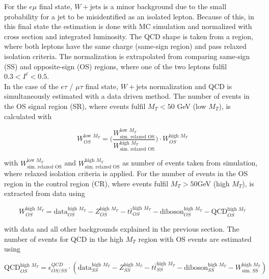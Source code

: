 For the $e\mu$ final state, $W + \text{jets}$ is a minor background due to the small probability for a jet to be misidentified as an isolated lepton. Because of this, in this final state the estimation is done with \gls{MC} simulation and normalized with cross section and integrated luminosity. The \gls{QCD} shape is taken from a region, where both leptons have the same charge (same-sign region) and pass relaxed isolation criteria. The normalization is extrapolated from comparing same-sign (SS) and opposite-sign (OS) regions, where one of the two leptons fulfil $0.3 < I^{\ell} < 0.5$.  \\

In the case of the $e\tau$ / $\mu\tau$ final state, $W + \text{jets}$ normalization and \gls{QCD} is simultaneously estimated with a data driven method. The number of events in the OS signal region (SR), where events fulfil $M_T < 50$ GeV (low $M_T$), is calculated with 

\begin{equation}
	W^{\text{low } M_T}_{OS} = \Bigg(\frac{W^{\text{low } M_T}_{\text{sim. relaxed OS}}}{W^{\text{high } M_T}_{\text{sim. relaxed OS}}}\Bigg) \cdot W^{\text{high } M_T}_{OS}
\end{equation}

with $W^{\text{low } M_T}_{\text{sim. relaxed OS}}$ and $W^{\text{high } M_T}_{\text{sim. relaxed OS}}$ as number of events taken from simulation, where relaxed isolation criteria is applied. For the number of events in the OS region in the control region (CR), where events fulfil $M_T > 50$GeV (high $M_T$), is extracted from data using 

\begin{equation}
	W^{\text{high } M_T}_{OS} = \text{data}^{\text{high } M_T}_{OS} - Z^{\text{high } M_T}_{OS} - t\bar{t}^{\text{high } M_T}_{OS} - \text{diboson}^{\text{high } M_T}_{OS} - \text{QCD}^{\text{high } M_T}_{OS}
\end{equation}

with data and all other backgrounds explained in the previous section. The number of events for QCD in the high $M_T$ region with OS events are estimated using

\begin{equation}
\text{QCD}^{\text{high } M_T}_{OS} = \epsilon^{QCD}_{OS/SS} \cdot (\text{data}^{\text{high } M_T}_{SS} - Z^{\text{high } M_T}_{SS} - t\bar{t}^{\text{high } M_T}_{SS} - \text{diboson}^{\text{high } M_T}_{SS} - W^{\text{high } M_T}_{\text{sim. SS}})
\end{equation}

